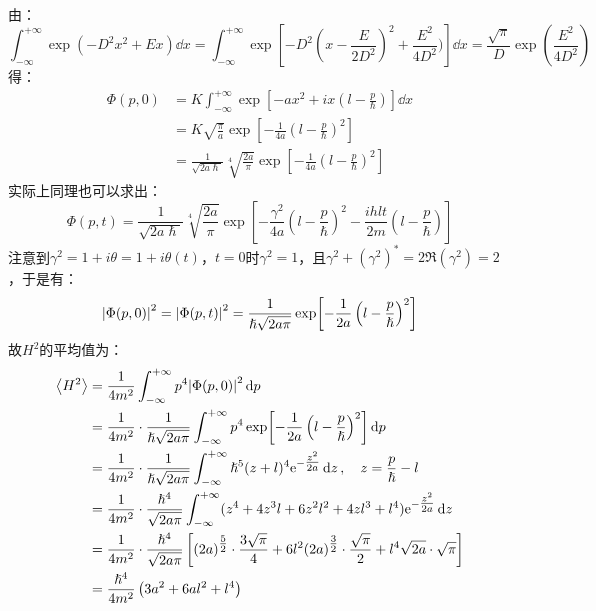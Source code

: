 \documentclass[a4paper,fontset=none]{ctexart}
\renewcommand\hbar\hslash
\begin{document}
\begin{itemize}
\begin{align*}
        \end{align*}
        由：
        \[
            \int_{-\infty}^{+\infty} \exp(-D^2 x^2 + Ex) \dd{x}
            = \int_{-\infty}^{+\infty} \exp[-D^2 \left(x - \frac{E}{2D^2}\right)^2 + \frac{E^2}{4D^2})] \dd{x}
            = \frac{\sqrt{\pi}}{D} \exp(\frac{E^2}{4D^2})
        \]
        得：
        \begin{align*}
            \Phi(p,0)
            &= K \int_{-\infty}^{+\infty} \exp[-ax^2 + ix \left(l - \frac{p}{\hbar}\right)] \dd{x} \\
            &= K \sqrt{\frac{\pi}{a}} \exp[-\frac{1}{4a} \left(l - \frac{p}{\hbar}\right)^2] \\
            &= \frac{1}{\sqrt{2a\hbar}} \sqrt[4]{\frac{2a}{\pi}} \exp[-\frac{1}{4a} \left(l - \frac{p}{\hbar}\right)^2]
        \end{align*}
        实际上同理也可以求出：
        \[
            \Phi(p,t) = \frac{1}{\sqrt{2a\hbar}} \sqrt[4]{\frac{2a}{\pi}} \exp[-\frac{\gamma^2}{4a} \left(l - \frac{p}{\hbar}\right)^2 - \frac{ihlt}{2m} \left(l - \frac{p}{\hbar}\right)]
        \]
        注意到$\gamma^2 = 1 + i\theta = 1 + i\theta(t)$，$t = 0$时$\gamma^2 = 1$，且$\gamma^2 + \left(\gamma^2\right)^* = 2\Re\left(\gamma^2\right) = 2$，于是有：
        \[
            \abs{\Phi(p,0)}^2 = \abs{\Phi(p,t)}^2 = \frac{1}{\hbar\sqrt{2a\pi}} \exp[-\frac{1}{2a}\left(l-\frac{p}{\hbar}\right)^2]
        \]
        故$H^2$的平均值为：
        \begin{align*}
            \expval{H^2}
            &= \frac{1}{4m^2} \int_{-\infty}^{+\infty} p^4 \abs{\Phi(p,0)}^2 \dd{p} \\
            &= \frac{1}{4m^2} \cdot \frac{1}{\hbar\sqrt{2a\pi}} \int_{-\infty}^{+\infty} p^4 \exp[-\frac{1}{2a}\left(l-\frac{p}{\hbar}\right)^2] \dd{p} \\
            &= \frac{1}{4m^2} \cdot \frac{1}{\hbar\sqrt{2a\pi}} \int_{-\infty}^{+\infty} \hbar^5 (z+l)^4 \mathrm{e}^{-\tfrac{z^2}{2a}} \dd{z},\quad z = \frac{p}{\hbar} - l \\
            &= \frac{1}{4m^2} \cdot \frac{\hbar^4}{\sqrt{2a\pi}} \int_{-\infty}^{+\infty} (z^4 + 4z^3 l + 6z^2 l^2 + 4z l^3 +l^4) \mathrm{e}^{-\tfrac{z^2}{2a}} \dd{z} \\
            &= \frac{1}{4m^2} \cdot \frac{\hbar^4}{\sqrt{2a\pi}} \left[(2a)^{\tfrac{5}{2}} \cdot \frac{3\sqrt{\pi}}{4} + 6l^2 (2a)^{\tfrac{3}{2}} \cdot \frac{\sqrt{\pi}}{2} + l^4 \sqrt{2a} \cdot \sqrt{\pi}\right] \\
            &= \frac{\hbar^4}{4m^2}\left(3a^2 + 6al^2 + l^4\right)

\end{align*}
\end{itemize}
\end{document}
